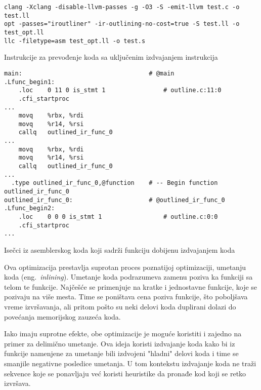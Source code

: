 \documentclass[12pt,oneside]{memoir}
\begin{document}
\begin{listing}
  \begin{verbatim}
clang -Xclang -disable-llvm-passes -g -O3 -S -emit-llvm test.c -o test.ll
opt -passes="iroutliner" -ir-outlining-no-cost=true -S test.ll -o test_opt.ll
llc -filetype=asm test_opt.ll -o test.s
  \end{verbatim}
  \caption{Instrukcije za prevođenje koda sa uključenim izdvajanjem instrukcija}
  \label{lst:outlining_compile_instructions}
\end{listing}

\begin{listing}
\begin{verbatim}
main:                                   # @main
.Lfunc_begin1:
	.loc	0 11 0 is_stmt 1                # outline.c:11:0
	.cfi_startproc
...
	movq	%rbx, %rdi
	movq	%r14, %rsi
	callq	outlined_ir_func_0
...
	movq	%rbx, %rdi
	movq	%r14, %rsi
	callq	outlined_ir_func_0
...
  .type	outlined_ir_func_0,@function    # -- Begin function outlined_ir_func_0
outlined_ir_func_0:                     # @outlined_ir_func_0
.Lfunc_begin2:
	.loc	0 0 0 is_stmt 1                 # outline.c:0:0
	.cfi_startproc
...
\end{verbatim}
\caption{Isečci iz asemblerskog koda koji sadrži funkciju dobijenu izdvajanjem koda}
\label{lst:outline_program_asm}
\end{listing}

Ova optimizacija prestavlja suprotan proces poznatijoj optimizaciji, umetanju koda (eng.~{\em inlining}).
Umetanje koda podrazumeva zamenu poziva ka funkciji sa telom te funkcije.
Najčešće se primenjuje na kratke i jednostavne funkcije, koje se pozivaju na više mesta.
Time se poništava cena poziva funkcije, što poboljšava vreme izvršavanja, ali pritom pošto su neki delovi koda duplirani dolazi do povećanja memorijskog zauzeća koda.


Iako imaju suprotne efekte, obe optimizacije je moguće koristiti i zajedno na primer za delimično umetanje. %
Ova ideja koristi izdvajanje koda kako bi iz funkcije namenjene za umetanje bili izdvojeni "hladni" delovi koda i time se smanjile negativne posledice umetanja.
U tom kontekstu izdvajanje koda ne traži sekvence koje se ponavljaju već koristi heuristike da pronađe kod koji se retko izvršava.
\end{document}
